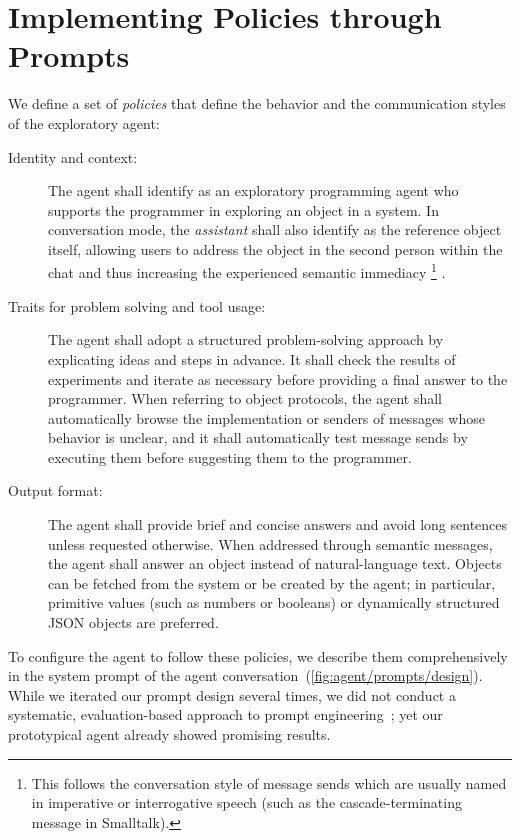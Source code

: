 
\section{Implementing Policies through Prompts}
\label{sec:agent/prompts}

We define a set of \emph{policies} that define the behavior and the communication styles of the exploratory agent:

\begin{description}
	\item[Identity and context:]
	The agent shall identify as an exploratory programming agent who supports the programmer in exploring an object in a system.
	In conversation mode, the \emph{assistant} shall also identify as the reference object itself, allowing users to address the object in the second person within the chat and thus increasing the experienced semantic immediacy%
	\footnote{This follows the conversation style of message sends which are usually named in imperative or interrogative speech (such as the cascade-terminating message  in Smalltalk).}%
	.
	\item[Traits for problem solving and tool usage:]
	The agent shall adopt a structured problem-solving approach by explicating ideas and steps in advance.
	It shall check the results of experiments and iterate as necessary before providing a final answer to the programmer.
	When referring to object protocols, the agent shall automatically browse the implementation or senders of messages whose behavior is unclear, and it shall automatically test message sends by executing them before suggesting them to the programmer.
	\item[Output format:]
	The agent shall provide brief and concise answers and avoid long sentences unless requested otherwise.
	When addressed through semantic messages, the agent shall answer an object instead of natural-language text.
	Objects can be fetched from the system or be created by the agent; in particular, primitive values (such as numbers or booleans) or dynamically structured JSON objects are preferred.
\end{description}

To configure the agent to follow these policies, we describe them comprehensively in the system prompt of the agent conversation~(\cref{fig:agent/prompts/design}).
While we iterated our prompt design several times, we did not conduct a systematic, evaluation-based approach to prompt engineering~\cite{zheng2023judging}; yet our prototypical agent already showed promising results.

